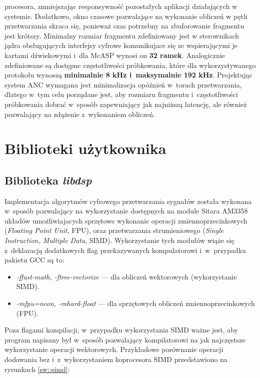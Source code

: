 procesora, zmniejszając responsywność pozostałych aplikacji działających w
systemie. Dodatkowo, okno czasowe pozwalające na wykonanie obliczeń w pętli
przetwarzania skraca się, ponieważ czas potrzebny na zbuforowanie fragmentu jest
krótszy. Minimalny rozmiar fragmentu zdefiniowany jest w sterownikach jądra
obsługujących interfejsy cyfrowe komunikujace się ze wspierającymi je kartami
dźwiekowymi i~dla McASP wynosi on \textbf{32 ramek}. Analogicznie zdefiniowane
są dostępne częstotliwości próbkowania, które dla wykorzystywanego protokołu
wynoszą \textbf{minimalnie 8 kHz i~maksymalnie 192 kHz}. Projektując system ANC
wymagana jest minimalizacja opóźnień w~torach przetwarzania, dlatego w~tym celu
porządane jest, aby rozmiaru fragmentu i~częstotliwości próbkowania dobrać
w~sposób zapewniający jak najniższą latencję, ale również pozwalający na
zdążenie z~wykonaniem obliczeń.
\section{Biblioteki użytkownika}

\subsection{Biblioteka \textit{libdsp}}

Implementacja algorytmów cyfrowego przetwarzania sygnałów została wykonana
w~sposób pozwalający na wykorzystanie dostępnych na module Sitara AM3358 układów
umożliwiajacych sprzętowe wykonanie operacji zmiennoprzecinkowych
(\textit{Floating Point Unit}, FPU), oraz przetwarzania strumieniowego
(\textit{Single Instruction, Multiple Data}, SIMD). Wykorzystanie tych modułów
wiąże się z~deklaracją dodatkowych flag przekazywanych kompulatorowi
i~w~przypadku pakietu GCC są to:
\begin{itemize} 
    \item \textit{-ffast-math, -ftree-vectorize} --- dla obliczeń wektorowych
    (wykorzystanie SIMD).
    \item \textit{-mfpu=neon, -mhard-float} --- dla sprzętowych obliczeń
    zmiennoprzecinkowych (FPU).
\end{itemize}

Poza flagami kompilacji, w~przypadku wykorzystania SIMD ważne jest, aby program
napisany był w~sposób pozwalający kompilatorowi na jak najczęstsze wykorzystanie
operacji wektorowych. Przykładowe porównanie operacji dodawania bez
i~z~wykorzystaniem koprocesora SIMD przedstawiono na rysunkach \ref{sw::simd}:

